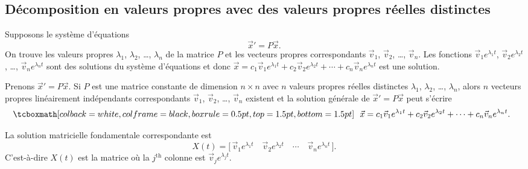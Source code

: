 \subsection{Décomposition en valeurs propres avec des valeurs propres réelles distinctes}

Supposons le système d’équations
\begin{equation*}
{\vec{x}}' = P\vec{x} .
\end{equation*}
On trouve les valeurs propres $\lambda_1$, $\lambda_2$, \ldots, $\lambda_n$
de la matrice $P$ et les vecteurs propres correspondants
$\vec{v}_1$, $\vec{v}_2$, \ldots, $\vec{v}_n$.
Les fonctions
$\vec{v}_1 e^{\lambda_1 t}$, 
$\vec{v}_2 e^{\lambda_2 t}$, \ldots,
$\vec{v}_n e^{\lambda_n t}$ sont des solutions du système d'équations et donc
$
\vec{x} = c_1 \vec{v}_1 e^{\lambda_1 t} +
c_2 \vec{v}_2 e^{\lambda_2 t} + \cdots +
c_n \vec{v}_n e^{\lambda_n t}
$
est une solution.

\begin{theorem}
Prenons ${\vec{x}}' = P\vec{x}$. Si $P$ est une matrice constante de dimension $n \times n$ avec $n$ valeurs propres réelles distinctes $\lambda_1$, $\lambda_2$, \ldots, $\lambda_n$,
alors $n$ vecteurs propres linéairement indépendants correspondants
$\vec{v}_1$, $\vec{v}_2$, \ldots, $\vec{v}_n$ existent et la solution générale de
${\vec{x}}' = P\vec{x}$
peut s’écrire
\begin{equation*}
\mybxbg{~~
\vec{x} = c_1 \vec{v}_1 e^{\lambda_1 t} +
c_2 \vec{v}_2 e^{\lambda_2 t} + \cdots +
c_n \vec{v}_n e^{\lambda_n t} .
~~}
\end{equation*}
\end{theorem}

La solution matricielle fondamentale correspondante est
\begin{equation*}
X(t) = \bigl[\, \vec{v}_1 e^{\lambda_1 t} \quad \vec{v}_2 e^{\lambda_2 t}
\quad \cdots \quad \vec{v}_n e^{\lambda_n t} \,\bigr].
\end{equation*}
C’est-à-dire $X(t)$
est la matrice où la $j^{\text{th}}$ colonne est
$\vec{v}_j e^{\lambda_j t}$.

